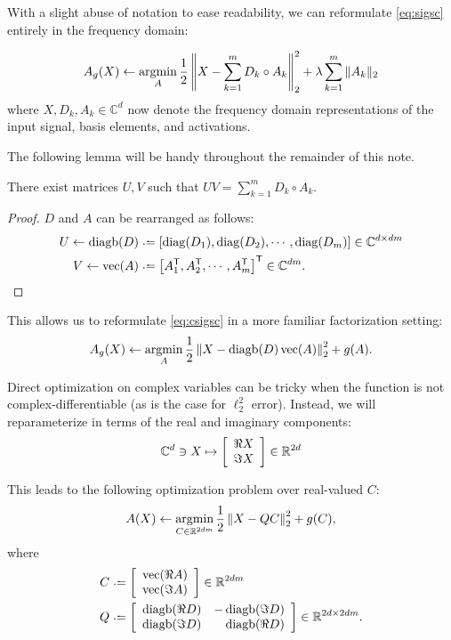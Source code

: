 \documentclass{article}
\DeclareMathOperator{\diagb}{diagb}
\DeclareMathOperator{\vectorize}{vec}
\renewcommand{\C}{\ensuremath{\mathbb{C}}}
\begin{document}
With a slight abuse of notation to ease readability, we can reformulate \autoref{eq:sigsc}
entirely in the frequency domain:

\begin{align}
A_g(X) \leftarrow \operatorname*{argmin}_A \frac{1}{2}\left\|X - \sum_{k=1}^m D_k \circ A_k\right\|_2^2 + \lambda \sum_{k=1}^m \|A_k\|_2 \label{eq:csigsc}
\end{align}
where $X, D_k, A_k \in \C^d$ now denote the frequency domain representations of the input signal, basis elements, and
activations.

The following lemma will be handy throughout the remainder of this note.
\begin{lemma}
There exist matrices $U, V$ such that $UV = \sum_{k=1}^m D_k \circ A_k$.
\label{lemma:rearrange}
\end{lemma}
\begin{proof}
$D$ and $A$ can be rearranged as follows:
\begin{align*}
U \leftarrow \diagb(D)     &\defeq \left[ \diag(D_1), \diag(D_2), \cdots, \diag(D_m)\right] \in \C^{d \times dm}\\
V \leftarrow \vectorize(A) &\defeq \left[ A_1\trans, A_2\trans, \cdots, A_m\trans\right]\trans \in \C^{dm}.
\end{align*}
\end{proof}

This allows us to reformulate \autoref{eq:csigsc} in a more familiar factorization setting:
\[
A_g(X) \leftarrow \argmin_A \frac{1}{2} \left\|X - \diagb(D)\vectorize(A)\right\|_2^2 + g(A).
\]

Direct optimization on complex variables can be tricky when the function is not complex-differentiable (as is the case for
$\ell_2^2$ error).  Instead, we will reparameterize in terms of the real and imaginary components:
\[
\C^d \ni X \mapsto \left[\begin{array}{r}\Re X \\ \Im X \end{array}\right] \in \R^{2d}
\]

This leads to the following optimization problem over real-valued $C$:
\begin{align}
A(X) \leftarrow \operatorname*{argmin}_{C\in\mathbb{R}^{2dm}} \frac{1}{2} \left\| X - QC\right\|_2^2 + g(C),\label{eq:sigsc:realized}
\end{align}
where
\begin{align*}
C &\defeq \left[\begin{array}{l}\vectorize(\Re A)\\\vectorize(\Im A)\end{array}\right] \in \R^{2dm}\\
Q &\defeq \left[\begin{array}{rr}\diagb(\Re D) & -\diagb(\Im D)\\ \diagb(\Im D)& \diagb(\Re D)\end{array}\right] \in \R^{2d\times 2dm}.
\end{align*}
\end{document}
